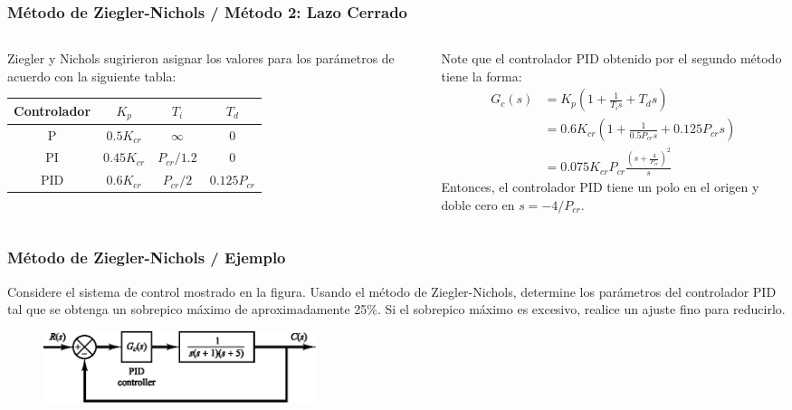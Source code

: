 \documentclass[aspectratio=169]{beamer}
\theoremstyle{definition}
\theoremstyle{plain}
\theoremstyle{remark}
\begin{document}
\begin{frame}[<+->]\frametitle{Método de Ziegler-Nichols / Método 2: Lazo Cerrado}
\begin{columns}
\begin{column}{0.5\textwidth}
	Ziegler y Nichols sugirieron asignar los valores para los parámetros de acuerdo con la siguiente tabla:
	\footnotesize
	\begin{table}
	\begin{tabular}{c|c|c|c}
		Controlador & $K_p$ & $T_i$ & $T_d$\\
		\hline
		P   & $0.5  K_{cr}$ & $\infty$ & 0\\
		PI  & $0.45 K_{cr}$ & $P_{cr}/1.2$ & 0\\
		PID & $0.6  K_{cr}$ & $P_{cr}/2$ & $0.125P_{cr}$
	\end{tabular}
	\end{table}
\end{column}	
\begin{column}{0.5\textwidth}
\small
Note que el controlador PID obtenido por el segundo método tiene la forma:
\begin{align*}
	G_c(s) &= K_p\left( 1 + \frac{1}{T_i s} + T_d s \right)\\
	&= 0.6 K_{cr} \left( 1 + \frac{1}{0.5 P_{cr}s} + 0.125 P_{cr}s \right)\\
	&= 0.075K_{cr}P_{cr} \frac{\left( s + \frac{4}{P_{cr}} \right)^2}{s}
\end{align*}
Entonces, el controlador PID tiene un polo en el origen y doble cero en $s = -4/P_{cr}$.
\end{column}	
\end{columns}
\end{frame}

\begin{frame}[<+->]\frametitle{Método de Ziegler-Nichols / Ejemplo}
Considere el sistema de control mostrado en la figura. Usando el método de Ziegler-Nichols, determine los parámetros del controlador PID tal que se obtenga un sobrepico máximo de aproximadamente 25\%. Si el sobrepico máximo es excesivo, realice un ajuste fino para reducirlo.
\begin{figure}
\includegraphics[width=8cm]{images/ejemplo1.eps}
\end{figure}
\end{frame}
\end{document}
